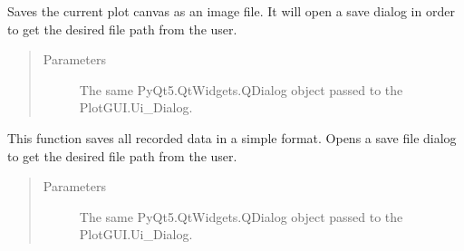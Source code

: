 \documentclass[letterpaper,10pt,english]{sphinxmanual}
\begin{document}
\begin{fulllineitems}
\begin{fulllineitems}
\end{fulllineitems}


\begin{fulllineitems}
\label{\detokenize{plotGUI:plotGUI.Ui_Dialog.save_image}}
Saves the current plot canvas as an image file.
It will open a save dialog in order to get the desired file path from the user.
\begin{quote}\begin{description}
\item[{Parameters}] \leavevmode
{} \textendash{} The same PyQt5.QtWidgets.QDialog object passed to the PlotGUI.Ui\_Dialog.

\end{description}\end{quote}

\end{fulllineitems}


\begin{fulllineitems}
\label{\detokenize{plotGUI:plotGUI.Ui_Dialog.save_csv}}
This function saves all recorded data in a simple format.
Opens a save file dialog to get the desired file path from the user.
\begin{quote}\begin{description}
\item[{Parameters}] \leavevmode
{} \textendash{} The same PyQt5.QtWidgets.QDialog object passed to the PlotGUI.Ui\_Dialog.

\end{description}\end{quote}

\end{fulllineitems}


\end{fulllineitems}

\end{document}
